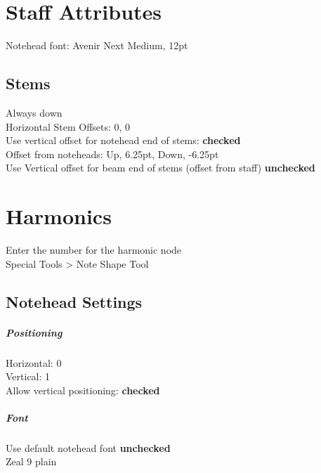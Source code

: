 \documentclass[]{memoir}
\begin{document}
\chapter{Staff Attributes}
\label{sec:staff-attributes}

Notehead font: Avenir Next Medium, 12pt\\

\section{Stems}
\label{sec:stems}

Always down\\
Horizontal Stem Offsets: 0, 0\\
Use vertical offset for notehead end of stems: \textbf{checked}\\
Offset from noteheads: Up, 6.25pt, Down, -6.25pt\\
Use Vertical offset for beam end of stems (offset from staff) \textbf{unchecked}\\


\chapter{Harmonics}
\label{sec:harmonics}

Enter the number for the harmonic node\\
Special Tools > Note Shape Tool\\

\section{Notehead Settings}
\label{sec:notehead-settings}

\paragraph{Positioning}
\label{sec:positioning}

Horizontal: 0\\
Vertical: 1\\
Allow vertical positioning: \textbf{checked}

\paragraph{Font}
\label{sec:font}

Use default notehead font \textbf{unchecked}\\
Zeal 9 plain
\end{document}
